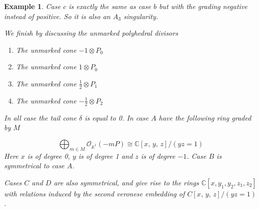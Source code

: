 \documentclass[11pt]{amsart}
\theoremstyle{plain}
\newtheorem{ex}[thm]{Example}
\begin{document}
\begin{ex}
Case $c$ is exactly the same as case $b$ but with the grading negative instead of positive. So it is also an $A_3$ singularity.


We finish by discussing the unmarked polyhedral divisors

\begin{enumerate}[label =\Alph*)]
\item The unmarked cone $-1 \otimes P_0$
\item The unmarked cone $1 \otimes P_0$
\item The unmarked cone $\frac{1}{2} \otimes P_1$
\item The unmarked cone $-\frac{1}{2} \otimes P_2$
\end{enumerate}

In all case the tail cone $\delta$ is equal to 0. In case $A$ have the following ring graded by $M$

\[
\bigoplus_{m \in M} \mathcal{O}_{\mathbb{A}^1}(-mP) \cong \mathbb{C}[x,\, y, \, z]/(yz = 1)
\]
Here $x$ is of degree 0, $y$ is of degree 1 and $z$ is of degree $-1$. Case $B$ is symmetrical to case $A$. 

Cases $C$ and $D$ are also symmetrical, and give rise to the rings $\mathbb{C}[x, y_1, y_2, z_1, z_2]$ with relations induced by the second veronese embedding of $C[x, \, y, \, z]/(yz = 1)$. 


\end{ex}
\end{document}
